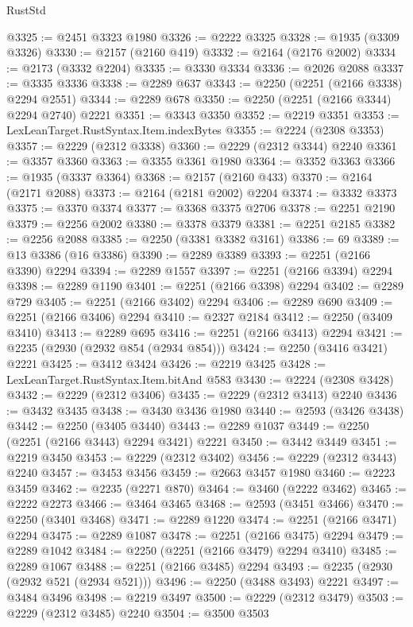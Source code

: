 \begin{lexlean}{RustStd}
\begin{coremodule}
@3325 := @2451 @3323 @1980
@3326 := @2222 @3325
@3328 := @1935 (@3309 @3326)
@3330 := @2157 (@2160 @419)
@3332 := @2164 (@2176 @2002)
@3334 := @2173 (@3332 @2204)
@3335 := @3330 @3334
@3336 := @2026 @2088
@3337 := @3335 @3336
@3338 := @2289 @637
@3343 := @2250 (@2251 (@2166 @3338) @2294 @2551)
@3344 := @2289 @678
@3350 := @2250 (@2251 (@2166 @3344) @2294 @2740) @2221
@3351 := @3343 @3350
@3352 := @2219 @3351
@3353 := LexLeanTarget.RustSyntax.Item.indexBytes
@3355 := @2224 (@2308 @3353)
@3357 := @2229 (@2312 @3338)
@3360 := @2229 (@2312 @3344) @2240
@3361 := @3357 @3360
@3363 := @3355 @3361 @1980
@3364 := @3352 @3363
@3366 := @1935 (@3337 @3364)
@3368 := @2157 (@2160 @433)
@3370 := @2164 (@2171 @2088)
@3373 := @2164 (@2181 @2002) @2204
@3374 := @3332 @3373
@3375 := @3370 @3374
@3377 := @3368 @3375 @2706
@3378 := @2251 @2190
@3379 := @2256 @2002
@3380 := @3378 @3379
@3381 := @2251 @2185
@3382 := @2256 @2088
@3385 := @2250 (@3381 @3382 @3161)
@3386 := 69
@3389 := @13 @3386 (@16 @3386)
@3390 := @2289 @3389
@3393 := @2251 (@2166 @3390) @2294
@3394 := @2289 @1557
@3397 := @2251 (@2166 @3394) @2294
@3398 := @2289 @1190
@3401 := @2251 (@2166 @3398) @2294
@3402 := @2289 @729
@3405 := @2251 (@2166 @3402) @2294
@3406 := @2289 @690
@3409 := @2251 (@2166 @3406) @2294
@3410 := @2327 @2184
@3412 := @2250 (@3409 @3410)
@3413 := @2289 @695
@3416 := @2251 (@2166 @3413) @2294
@3421 := @2235 (@2930 (@2932 @854 (@2934 @854)))
@3424 := @2250 (@3416 @3421) @2221
@3425 := @3412 @3424
@3426 := @2219 @3425
@3428 := LexLeanTarget.RustSyntax.Item.bitAnd @583
@3430 := @2224 (@2308 @3428)
@3432 := @2229 (@2312 @3406)
@3435 := @2229 (@2312 @3413) @2240
@3436 := @3432 @3435
@3438 := @3430 @3436 @1980
@3440 := @2593 (@3426 @3438)
@3442 := @2250 (@3405 @3440)
@3443 := @2289 @1037
@3449 := @2250 (@2251 (@2166 @3443) @2294 @3421) @2221
@3450 := @3442 @3449
@3451 := @2219 @3450
@3453 := @2229 (@2312 @3402)
@3456 := @2229 (@2312 @3443) @2240
@3457 := @3453 @3456
@3459 := @2663 @3457 @1980
@3460 := @2223 @3459
@3462 := @2235 (@2271 @870)
@3464 := @3460 (@2222 @3462)
@3465 := @2222 @2273
@3466 := @3464 @3465
@3468 := @2593 (@3451 @3466)
@3470 := @2250 (@3401 @3468)
@3471 := @2289 @1220
@3474 := @2251 (@2166 @3471) @2294
@3475 := @2289 @1087
@3478 := @2251 (@2166 @3475) @2294
@3479 := @2289 @1042
@3484 := @2250 (@2251 (@2166 @3479) @2294 @3410)
@3485 := @2289 @1067
@3488 := @2251 (@2166 @3485) @2294
@3493 := @2235 (@2930 (@2932 @521 (@2934 @521)))
@3496 := @2250 (@3488 @3493) @2221
@3497 := @3484 @3496
@3498 := @2219 @3497
@3500 := @2229 (@2312 @3479)
@3503 := @2229 (@2312 @3485) @2240
@3504 := @3500 @3503

\end{coremodule}
\end{lexlean}
